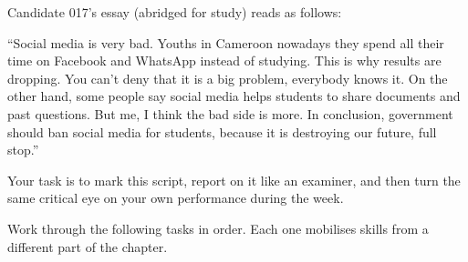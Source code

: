 \documentclass[11pt]{article}
\newcounter{popsec}
\newcounter{popsub}
\newcommand{\courssub}[1]{%
  \stepcounter{popsub}%
  \par\vspace{9pt}\noindent{\popxbold\fontsize{11.5}{13}\selectfont\color{popink}{\color{poporange}\thepopsec.\thepopsub}\hspace{6pt}#1}\par\nopagebreak\vspace{4pt}
}
\begin{document}
Candidate 017's essay (abridged for study) reads as follows:

\begin{exemplebox}
``Social media is very bad. Youths in Cameroon nowadays they spend all their time on Facebook and WhatsApp instead of studying. This is why results are dropping. You can't deny that it is a big problem, everybody knows it. On the other hand, some people say social media helps students to share documents and past questions. But me, I think the bad side is more. In conclusion, government should ban social media for students, because it is destroying our future, full stop.''
\end{exemplebox}

Your task is to mark this script, report on it like an examiner, and then turn the same critical eye on your own performance during the week.

\courssub{Tasks}

Work through the following tasks in order. Each one mobilises skills from a different part of the chapter.
\end{document}
